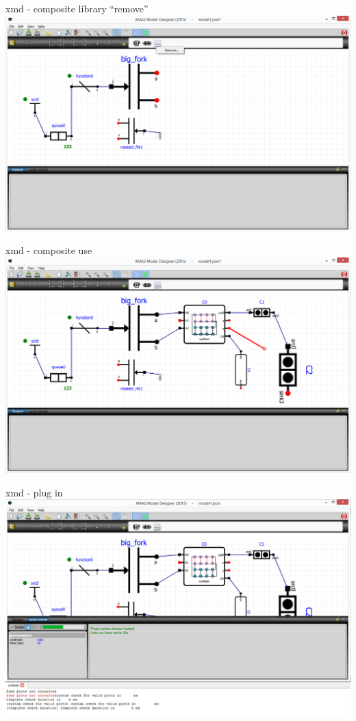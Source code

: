 \documentclass[11pt]{beamer}
\begin{document}
\begin{frame}{xmd - composite library ``remove''}
	\includegraphics[width=.90\linewidth]{pictures/2k-xmd-compositelibrary-remove}
\end{frame}
\begin{frame}{xmd - composite use}
	\includegraphics[width=.90\linewidth]{pictures/2l-xmd-composite-use}
\end{frame}
\begin{frame}{xmd - plug in}
	\includegraphics[width=.90\linewidth]{pictures/2m-xmd-plug-in}
\end{frame}
\end{document}
